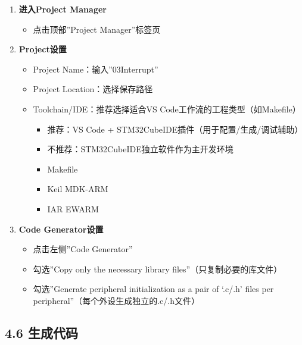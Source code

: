 \documentclass[
  chinese,
  UTF8,
  oneside,
  openany]{ctexbook}
\providecommand{\tightlist}{%
  \setlength{\itemsep}{0pt}\setlength{\parskip}{0pt}}
\begin{document}
\begin{enumerate}
\def\labelenumi{\arabic{enumi}.}
\tightlist
\item
  \textbf{进入Project Manager}

  \begin{itemize}
  \tightlist
  \item
    点击顶部''Project Manager''标签页
  \end{itemize}
\item
  \textbf{Project设置}

  \begin{itemize}
  \tightlist
  \item
    Project Name：输入''03Interrupt''
  \item
    Project Location：选择保存路径
  \item
    Toolchain/IDE：推荐选择适合VS Code工作流的工程类型（如Makefile）

    \begin{itemize}
    \tightlist
    \item
      推荐：VS Code + STM32CubeIDE插件（用于配置/生成/调试辅助）
    \item
      不推荐：STM32CubeIDE独立软件作为主开发环境
    \item
      Makefile
    \item
      Keil MDK-ARM
    \item
      IAR EWARM
    \end{itemize}
  \end{itemize}
\item
  \textbf{Code Generator设置}

  \begin{itemize}
  \tightlist
  \item
    点击左侧''Code Generator''
  \item
    勾选''Copy only the necessary library files''（只复制必要的库文件）
  \item
    勾选''Generate peripheral initialization as a pair of `.c/.h' files
    per peripheral''（每个外设生成独立的.c/.h文件）
  \end{itemize}
\end{enumerate}

\subsection{4.6 生成代码}\label{ux751fux6210ux4ee3ux7801-1}
\end{document}
